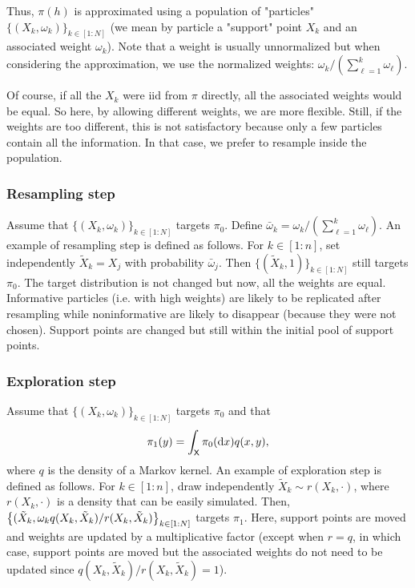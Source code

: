 \documentclass[english,graybox,envcountchap,envcountsame,sectrefs,shortlabels]{svmono}
\theoremstyle{style}
\newcommand{\eqsp}{}
\newcommand{\Xset}{\mathsf{X}}
\begin{document}
Thus, $\pi(h)$ is approximated using a population of "particles" $\{(X_k,\omega_k)\}_{k\in[1:N]}$ (we mean by particle a "support" point $X_k$ and an associated weight $\omega_k$). Note that a weight is usually unnormalized but when considering the approximation, we use the normalized weights: $\omega_k/(\sum_{\ell=1}^{k} \omega_\ell)$.

Of course, if all the $X_k$ were iid from $\pi$ directly, all the associated weights would be equal. So here, by allowing different weights, we are more flexible. Still, if the weights are too different, this is not satisfactory because only a few particles contain all the information. In that case, we prefer to resample inside the population. 

\subsubsection*{Resampling step}
Assume that $\{(X_k,\omega_k)\}_{k\in[1:N]}$ targets $\pi_0$. Define $\bar \omega_k=\omega_k/(\sum_{\ell=1}^{k} \omega_\ell)$. An example of resampling step is defined as follows. For $k\in[1:n]$, set independently $\tilde X_k = X_j$ with probability $\bar \omega_j$. 
Then $\{(\tilde X_k,1)\}_{k\in[1:N]}$ still targets $\pi_0$. The target distribution is not changed but now, all the weights are equal. Informative particles (i.e. with high weights) are likely to be replicated after resampling while noninformative are likely to disappear (because they were not chosen). Support points are changed but still within the initial pool of support points.

\subsubsection*{Exploration step}
Assume that $\{(X_k,\omega_k)\}_{k\in[1:N]}$ targets $\pi_0$ and that
\begin{equation} \label{eq:explor}
\pi_1(y)=\int_\Xset \pi_0(\rmd x) q(x,y)\eqsp,
\end{equation}
where $q$ is the density of a Markov kernel. An example of exploration step is defined as follows. For $k\in[1:n]$, draw independently $\tilde X_k\sim r(X_k,\cdot)$, 
where $r(X_k,\cdot)$ is a density that can be easily simulated.
Then, $\left\{ (\tilde X_k,\omega_k q(X_k,\tilde X_k)/r(X_k,\tilde X_k)\right\}_{k\in[1:N]}$ targets $\pi_1$.
Here, support points are moved and weights are updated by a multiplicative factor (except when $r=q$, in which case, support points are moved but the associated weights do not need to be updated  since $ q(X_k,\tilde X_k)/r(X_k,\tilde X_k)=1$).
\end{document}
